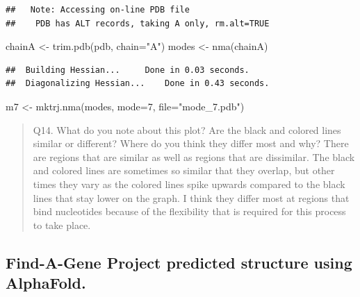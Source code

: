 \documentclass[
]{article}
\newenvironment{Shaded}{\begin{snugshade}}{\end{snugshade}}
\newcommand{\AttributeTok}[1]{\textcolor[rgb]{0.77,0.63,0.00}{#1}}
\newcommand{\DecValTok}[1]{\textcolor[rgb]{0.00,0.00,0.81}{#1}}
\newcommand{\FunctionTok}[1]{\textcolor[rgb]{0.00,0.00,0.00}{#1}}
\newcommand{\NormalTok}[1]{#1}
\newcommand{\OtherTok}[1]{\textcolor[rgb]{0.56,0.35,0.01}{#1}}
\newcommand{\StringTok}[1]{\textcolor[rgb]{0.31,0.60,0.02}{#1}}
\begin{document}
\begin{verbatim}
##   Note: Accessing on-line PDB file
##    PDB has ALT records, taking A only, rm.alt=TRUE
\end{verbatim}

\begin{Shaded}
\begin{Highlighting}[]
\NormalTok{chainA }\OtherTok{\textless{}{-}} \FunctionTok{trim.pdb}\NormalTok{(pdb, }\AttributeTok{chain=}\StringTok{"A"}\NormalTok{)}
\NormalTok{modes }\OtherTok{\textless{}{-}} \FunctionTok{nma}\NormalTok{(chainA)}
\end{Highlighting}
\end{Shaded}

\begin{verbatim}
##  Building Hessian...     Done in 0.03 seconds.
##  Diagonalizing Hessian...    Done in 0.43 seconds.
\end{verbatim}

\begin{Shaded}
\begin{Highlighting}[]
\NormalTok{m7 }\OtherTok{\textless{}{-}} \FunctionTok{mktrj.nma}\NormalTok{(modes, }\AttributeTok{mode=}\DecValTok{7}\NormalTok{, }\AttributeTok{file=}\StringTok{"mode\_7.pdb"}\NormalTok{)}
\end{Highlighting}
\end{Shaded}

\begin{quote}
Q14. What do you note about this plot? Are the black and colored lines
similar or different? Where do you think they differ most and why? There
are regions that are similar as well as regions that are dissimilar. The
black and colored lines are sometimes so similar that they overlap, but
other times they vary as the colored lines spike upwards compared to the
black lines that stay lower on the graph. I think they differ most at
regions that bind nucleotides because of the flexibility that is
required for this process to take place.
\end{quote}

\hypertarget{find-a-gene-project-predicted-structure-using-alphafold.}{%
\subsection{Find-A-Gene Project predicted structure using
AlphaFold.}\label{find-a-gene-project-predicted-structure-using-alphafold.}}
\end{document}

